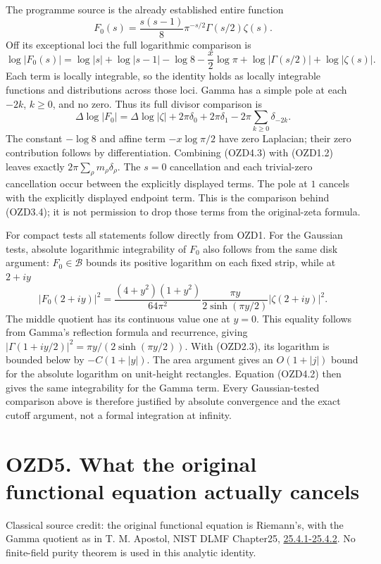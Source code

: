 The programme source is the already established entire function \[
F_0(s)=\frac{s(s-1)}8\pi^{-s/2}\Gamma(s/2)\zeta(s).
\tag{OZD4.1}
\] Off its exceptional loci the full logarithmic comparison is \[
\log|F_0(s)|=\log|s|+\log|s-1|-\log8
-\frac{x}{2}\log\pi+\log|\Gamma(s/2)|+\log|\zeta(s)|.
\tag{OZD4.2}
\] Each term is locally integrable, so the identity holds as locally
integrable functions and distributions across those loci. Gamma has a
simple pole at each \(-2k\), \(k\ge0\), and no zero. Thus its full
divisor comparison is \[
\Delta\log|F_0|=\Delta\log|\zeta|
+2\pi\delta_0+2\pi\delta_1
-2\pi\sum_{k\ge0}\delta_{-2k}.
\tag{OZD4.3}
\] The constant \(-\log8\) and affine term \(-x\log\pi/2\) have zero
Laplacian; their zero contribution follows by differentiation. Combining
(OZD4.3) with (OZD1.2) leaves exactly
\(2\pi\sum_\rho m_\rho\delta_\rho\). The \(s=0\) cancellation and each
trivial-zero cancellation occur between the explicitly displayed terms.
The pole at \(1\) cancels with the explicitly displayed endpoint term.
This is the comparison behind (OZD3.4); it is not permission to drop
those terms from the original-zeta formula.

For compact tests all statements follow directly from OZD1. For the
Gaussian tests, absolute logarithmic integrability of \(F_0\) also
follows from the same disk argument: \(F_0\in\mathcal B\) bounds its
positive logarithm on each fixed strip, while at \(2+iy\) \[
|F_0(2+iy)|^2=
\frac{(4+y^2)(1+y^2)}{64\pi^2}
\frac{\pi y}{2\sinh(\pi y/2)}|\zeta(2+iy)|^2.
\tag{OZD4.4}
\] The middle quotient has its continuous value one at \(y=0\). This
equality follows from Gamma's reflection formula and recurrence, giving
\(|\Gamma(1+iy/2)|^2=\pi y/(2\sinh(\pi y/2))\). With (OZD2.3), its
logarithm is bounded below by \(-C(1+|y|)\). The area argument gives an
\(O(1+|j|)\) bound for the absolute logarithm on unit-height rectangles.
Equation (OZD4.2) then gives the same integrability for the Gamma term.
Every Gaussian-tested comparison above is therefore justified by
absolute convergence and the exact cutoff argument, not a formal
integration at infinity.

\section{OZD5. What the original functional equation actually
cancels}\label{ozd5.-what-the-original-functional-equation-actually-cancels}

Classical source credit: the original functional equation is Riemann's,
with the Gamma quotient as in T. M. Apostol, NIST DLMF Chapter25,
\href{https://dlmf.nist.gov/25.4}{25.4.1-25.4.2}. No finite-field purity
theorem is used in this analytic identity.

